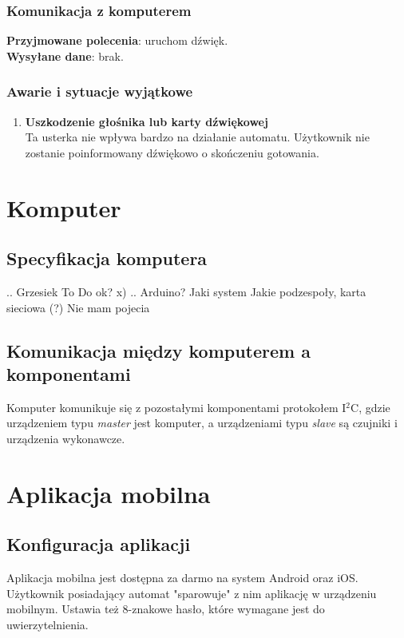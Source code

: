 \documentclass[12pt,a4paper,notitlepage]{article}
\begin{document}
\subsubsection{Komunikacja z komputerem}
\textbf{Przyjmowane polecenia}: uruchom dźwięk.\\
\textbf{Wysyłane dane}: brak.


\subsubsection{Awarie i sytuacje wyjątkowe}
\begin{enumerate}
  \item \textbf{Uszkodzenie głośnika lub karty dźwiękowej}\\
Ta usterka nie wpływa bardzo na działanie automatu. Użytkownik nie zostanie poinformowany dźwiękowo o skończeniu gotowania.
\end{enumerate}

\section{Komputer}

\subsection{Specyfikacja komputera}
.. Grzesiek To Do ok? x) ..
Arduino?
Jaki system
Jakie podzespoły, karta sieciowa (?)
Nie mam pojecia

\subsection{Komunikacja między komputerem a komponentami}
Komputer komunikuje się z pozostałymi komponentami protokołem I$^2$C, gdzie urządzeniem typu \emph{master} jest komputer, a urządzeniami typu \emph{slave} są czujniki i urządzenia wykonawcze.

\section{Aplikacja mobilna}
\subsection{Konfiguracja aplikacji}
Aplikacja mobilna jest dostępna za darmo na system Android oraz iOS. Użytkownik posiadający automat "sparowuje" z nim aplikację w urządzeniu mobilnym. Ustawia też 8-znakowe hasło, które wymagane jest do uwierzytelnienia.
\end{document}
